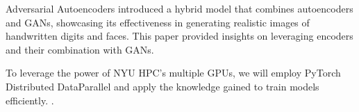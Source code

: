 \documentclass[letterpaper]{article} %
\begin{document}
Adversarial Autoencoders\cite{encod} introduced a hybrid model that combines autoencoders and GANs, showcasing its effectiveness in generating realistic images of handwritten digits and faces. This paper provided insights on leveraging encoders and their combination with GANs.

To leverage the power of NYU HPC's multiple GPUs, we will employ PyTorch Distributed DataParallel and apply the knowledge gained to train models efficiently. 
. \\
\end{document}
